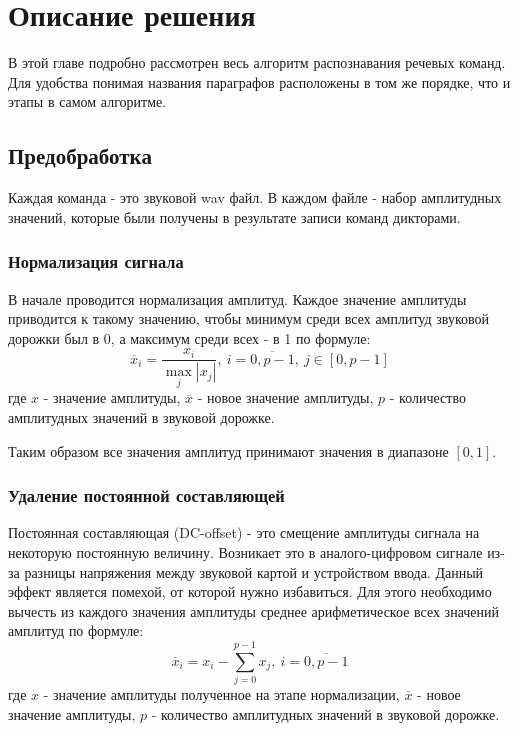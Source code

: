 \section{Описание решения}
В этой главе подробно рассмотрен весь алгоритм распознавания речевых команд. Для удобства понимая названия параграфов расположены в том же порядке, что и этапы в самом алгоритме.

\subsection{Предобработка}
Каждая команда - это звуковой wav файл. В каждом файле - набор амплитудных значений, которые были получены в результате записи команд дикторами. 

\subsubsection{Нормализация сигнала}
В начале проводится нормализация амплитуд. Каждое значение амплитуды приводится к такому значению, чтобы минимум среди всех амплитуд звуковой дорожки был в 0, а максимум среди всех - в 1 по формуле:
\begin{equation}
	\overline{x}_i=\dfrac{x_i}{\max_{j} |x_j|},~i=\overline{0, p-1},~j \in [0, p-1]
\end{equation}
где $x$ - значение амплитуды, $\overline{x}$ - новое значение амплитуды, $p$ - количество амплитудных значений в звуковой дорожке.

Таким образом все значения амплитуд принимают значения в диапазоне $[0,1]$.

\subsubsection{Удаление постоянной составляющей}
Постоянная составляющая (DC-offset) - это смещение амплитуды сигнала на некоторую постоянную величину. Возникает это в аналого-цифровом сигнале из-за разницы напряжения между звуковой картой и устройством ввода. Данный эффект является помехой, от которой нужно избавиться. Для этого необходимо вычесть из каждого значения амплитуды среднее арифметическое всех значений амплитуд по формуле:
\begin{equation}
\overline{x}_i=x_i - \sum_{j=0}^{p-1} x_j,~i=\overline{0, p-1}
\end{equation}
где $x$ - значение амплитуды полученное на этапе нормализации, $\overline{x}$ - новое значение амплитуды, $p$ - количество амплитудных значений в звуковой дорожке.

